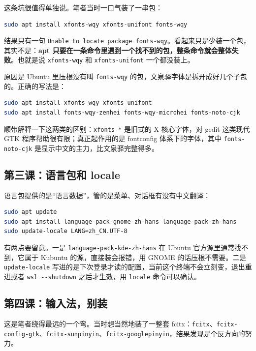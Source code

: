 \documentclass[12pt,a4paper]{ctexbook}
\begin{document}
这条坑很值得单独说。笔者当时一口气装了一串包：

\begin{lstlisting}[language=bash,title={看起来没问题的命令}]
sudo apt install xfonts-wqy xfonts-unifont fonts-wqy
\end{lstlisting}

结果只有一句 \verb|Unable to locate package fonts-wqy|。看起来只是少装一个包，其实不是：\textbf{apt 只要在一条命令里遇到一个找不到的包，整条命令就会整体失败}。也就是说 \verb|xfonts-wqy| 和 \verb|xfonts-unifont| 一个都没装上。

原因是 Ubuntu 里压根没有叫 \verb|fonts-wqy| 的包，文泉驿字体是拆开成好几个子包的。正确的写法是：

\begin{lstlisting}[language=bash,title={分两条，先装 X 字体，再装真正有用的字体}]
sudo apt install xfonts-wqy xfonts-unifont
sudo apt install fonts-wqy-zenhei fonts-wqy-microhei fonts-noto-cjk
\end{lstlisting}

顺带解释一下这两类的区别：\verb|xfonts-*| 是旧式的 X 核心字体，对 gedit 这类现代 GTK 程序帮助很有限；真正起作用的是 fontconfig 体系下的字体，其中 \verb|fonts-noto-cjk| 是显示中文的主力，比文泉驿完整得多。

\subsection{第三课：语言包和 locale}

语言包提供的是``语言数据''，管的是菜单、对话框有没有中文翻译：

\begin{lstlisting}[language=bash,title={安装中文语言包并设定默认 locale}]
sudo apt update
sudo apt install language-pack-gnome-zh-hans language-pack-zh-hans
sudo update-locale LANG=zh_CN.UTF-8
\end{lstlisting}

有两点要留意。一是 \verb|language-pack-kde-zh-hans| 在 Ubuntu 官方源里通常找不到，它属于 Kubuntu 的源，直接装会报错，用 GNOME 的话压根不需要。二是 \verb|update-locale| 写进的是下次登录才读的配置，当前这个终端不会立刻变，退出重进或者 \verb|wsl --shutdown| 之后才生效，用 \verb|locale| 命令可以确认。

\subsection{第四课：输入法，别装}

这是笔者绕得最远的一个弯。当时想当然地装了一整套 fcitx：\verb|fcitx|、\verb|fcitx-config-gtk|、\verb|fcitx-sunpinyin|、\verb|fcitx-googlepinyin|，结果发现是个反方向的努力。
\end{document}
